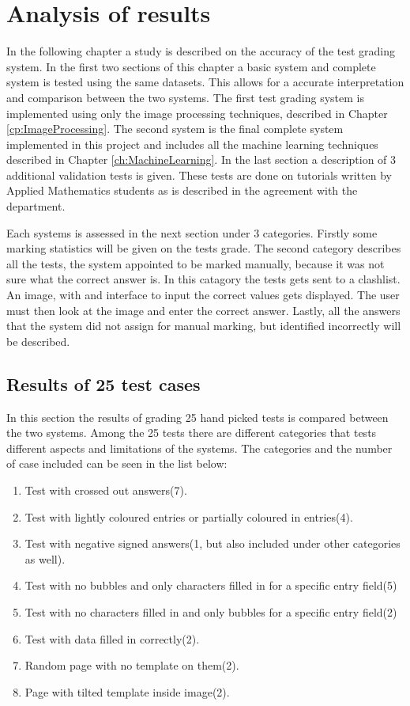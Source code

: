 \chapter{Analysis of results}
\label{ch:Results}
\ifpdf
\graphicspath{{Chapter5/Chapter5Figures/}}
\fi

In the following chapter a study is described on the accuracy of the test grading system. In the first two sections of this chapter a basic system and complete system is tested using the same datasets. This allows for a accurate interpretation and comparison between the two systems. The first test grading system is implemented using only the image processing techniques, described in Chapter \ref{cp:ImageProcessing}. The second system is the final complete system implemented in this project and includes all the machine learning techniques described in Chapter \ref{ch:MachineLearning}. In the last section a description of 3 additional validation tests is given. These tests are done on tutorials written by Applied Mathematics students as is described in the agreement with the department.

Each systems is assessed in the next section under 3 categories. Firstly some marking statistics will be given on the tests grade. The second category describes all the tests, the system appointed to be marked manually, because it was not sure what the correct answer is. In this catagory the tests gets sent to a clashlist. An image, with and interface to input the correct values gets displayed. The user must then look at the image and enter the correct answer. Lastly, all the answers that the system did not assign for manual marking, but identified incorrectly will be described.

\section{Results of 25 test cases}

In this section the results of grading 25 hand picked tests is compared between the two systems. Among the 25 tests there are different categories that tests different aspects and limitations of the systems. The categories and the number of case included can be seen in the list below:

\begin{enumerate}
\item Test with crossed out answers(7).
\item Test with lightly coloured entries or partially coloured in entries(4).
\item Test with negative signed answers(1, but also included under other categories as well).
\item Test with no bubbles and only characters filled in for a specific entry field(5)
\item Test with no characters filled in and only bubbles for a specific entry field(2)
\item Test with data filled in correctly(2).
\item Random page with no template on them(2).
\item Page with tilted template inside image(2).
\end{enumerate}

